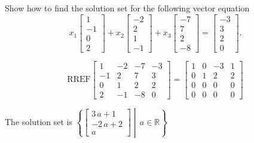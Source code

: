 
\begin{exerciseStatement}


Show how to find the solution set for the following vector equation \[ x_{1} \left[\begin{array}{c}
1 \\
-1 \\
0 \\
2
\end{array}\right] + x_{2} \left[\begin{array}{c}
-2 \\
2 \\
1 \\
-1
\end{array}\right] + x_{3} \left[\begin{array}{c}
-7 \\
7 \\
2 \\
-8
\end{array}\right] = \left[\begin{array}{c}
-3 \\
3 \\
2 \\
0
\end{array}\right] .\]


\end{exerciseStatement}
    
\begin{exerciseAnswer} 
\[\mathrm{RREF} \left[\begin{array}{ccc|c}
1 & -2 & -7 & -3 \\
-1 & 2 & 7 & 3 \\
0 & 1 & 2 & 2 \\
2 & -1 & -8 & 0
\end{array}\right]  =  \left[\begin{array}{ccc|c}
1 & 0 & -3 & 1 \\
0 & 1 & 2 & 2 \\
0 & 0 & 0 & 0 \\
0 & 0 & 0 & 0
\end{array}\right] \]

The solution set is \( \left\{ \left[\begin{array}{c}
3 \, a + 1 \\
-2 \, a + 2 \\
a
\end{array}\right] \middle|\,a\in\mathbb{R}\right\} \)


\end{exerciseAnswer}
    
